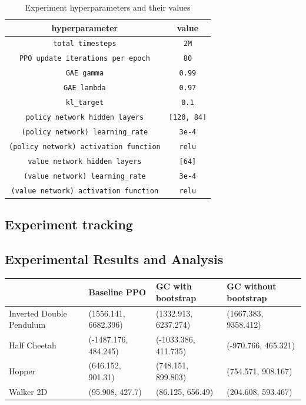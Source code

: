 \begin{table}
  \begin{center}
    \begin{tabular}{cc}
      \hline 
      hyperparameter & value \\ 
      \hline 
      \verb!total timesteps! & \verb!2M! \\
      \verb!PPO update iterations per epoch! &  \verb!80! \\
      \verb!GAE gamma! & \verb!0.99! \\
      \verb!GAE lambda! & \verb!0.97! \\
      \verb!kl_target! & \verb!0.1! \\
      \verb!policy network hidden layers! & \verb![120, 84]! \\
      \verb!(policy network) learning_rate! & \verb!3e-4! \\
      \verb!(policy network) activation function! & \verb!relu!\\
      \verb!value network hidden layers! & \verb![64]! \\
      \verb!(value network) learning_rate! & \verb!3e-4! \\
      \verb!(value network) activation function! & \verb!relu! \\
      \hline      
    \end{tabular}
  \end{center}
  \caption{Experiment hyperparameters and their values}
  \label{hyperparameters}
\end{table}




\subsection{Experiment tracking}
 




\subsection{Experimental Results and Analysis}

\begin{tabular}{llll}
    \hline
    & Baseline PPO & GC with bootstrap & GC without bootstrap \\
    \hline
    Inverted Double Pendulum & (1556.141, 6682.396) & (1332.913, 6237.274) & (1667.383, 9358.412) \\
    \hline
    Half Cheetah & (-1487.176, 484.245) & (-1033.386, 411.735) & (-970.766, 465.321)\\
    \hline
    Hopper & (646.152, 901.31) & (748.151, 899.803) & (754.571, 908.167) \\
    \hline
    Walker 2D & (95.908, 427.7) & (86.125, 656.49) & (204.608, 593.467) \\
    \hline  
\end{tabular}


